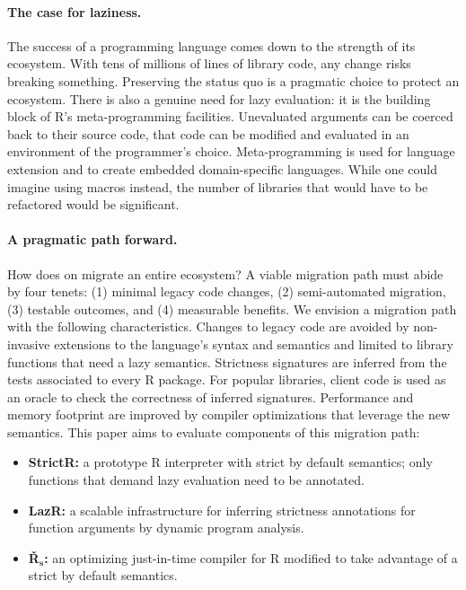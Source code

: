 \documentclass[review,creen,acmsmall]{acmart}
\begin{document}
\paragraph{The case for laziness.} The success of a programming language
comes down to the strength of its ecosystem. With tens of millions of lines of
library code, any change risks breaking something. Preserving the status quo is
a pragmatic choice to protect an ecosystem. There is also a genuine need for
lazy evaluation: it is the building block of R's meta-programming facilities.
Unevaluated arguments can be coerced back to their source code, that code can be
modified and evaluated in an environment of the programmer's choice.
Meta-programming is used for language extension and to create embedded
domain-specific languages. While one could imagine using macros instead, the
number of libraries that would have to be refactored would be significant.

\paragraph{A pragmatic path forward.} How does on migrate an entire ecosystem?
A viable migration path must abide by four tenets: (1) minimal legacy code
changes, (2) semi-automated migration, (3) testable outcomes, and (4) measurable
benefits. We envision a migration path with the following characteristics.
Changes to legacy code are avoided by non-invasive extensions to the language's
syntax and semantics and limited to library functions that need a lazy
semantics. Strictness signatures are inferred from the tests associated to every
R package. For popular libraries, client code is used as an oracle to check the
correctness of inferred signatures. Performance and memory footprint are
improved by compiler optimizations that leverage the new semantics. This paper
aims to evaluate components of this migration path:

\newcommand{\rshstrict}{{\sf {\v R}$_{\mathsf s}$ }} %
\newcommand{\brshstrict}{{\bf {\v R}$_{\mathbf s}$}}

\begin{itemize}[---]
\item {\bf StrictR:} a prototype R interpreter with strict by default semantics;
  only functions that demand lazy evaluation need to be annotated.
\item {\bf LazR:} a scalable infrastructure for inferring strictness annotations
  for function arguments by dynamic program analysis.
\item {\bf \brshstrict:} an optimizing just-in-time compiler for R modified to
  take advantage of a strict by default semantics.
\end{itemize}
\end{document}
